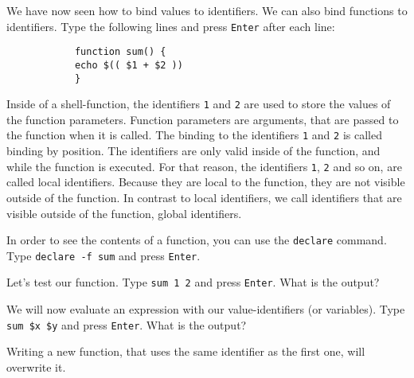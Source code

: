 \begin{challenge}
    \begin{task}
        We have now seen how to bind values to identifiers.
        We can also bind functions to identifiers.
        Type the following lines and press \texttt{Enter} after each line:
        \begin{lstlisting}
            function sum() {
            echo $(( $1 + $2 ))
            }
        \end{lstlisting}
        Inside of a shell-function, the identifiers \texttt{1} and \texttt{2} are used to store the values of the function parameters.
        Function parameters are arguments, that are passed to the function when it is called.
        The binding to the identifiers \texttt{1} and \texttt{2} is called binding by position.
        The identifiers are only valid inside of the function, and while the function is executed. 
        For that reason, the identifiers \texttt{1}, \texttt{2} and so on, are called local identifiers. 
        Because they are local to the function, they are not visible outside of the function.
        In contrast to local identifiers, we call identifiers that are visible outside of the function, global identifiers.
        \begin{questions}
            \item In order to see the contents of a function, you can use the \texttt{declare} command. Type \texttt{declare -f sum} and press \texttt{Enter}.
            \item Let's test our function. Type \texttt{sum 1 2} and press \texttt{Enter}. What is the output?
            \item We will now evaluate an expression with our value-identifiers (or variables). Type \texttt{sum \$x \$y} and press \texttt{Enter}. What is the output?
            \item Writing a new function, that uses the same identifier as the first one, will overwrite it.
        \end{questions}
    \end{task}


\end{challenge}
